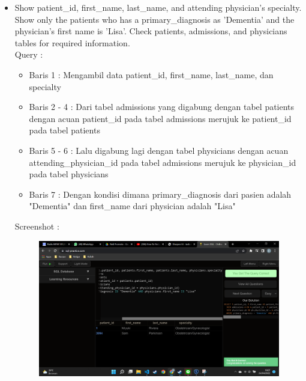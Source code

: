 \documentclass[]{article}
\begin{document}
\begin{itemize}
        \item Show patient\_id, first\_name, last\_name, and attending physician's specialty. Show only the patients who has a primary\_diagnosis as 'Dementia' and the physician's first name is 'Lisa'. Check patients, admissions, and physicians tables for required information.
        \\Query :
        
        \begin{itemize}
            \item Baris 1 : Mengambil data patient\_id, first\_name, last\_name, dan specialty
            \item Baris 2 - 4 : Dari tabel admissions yang digabung dengan tabel patients dengan acuan patient\_id pada tabel admissions merujuk ke patient\_id pada tabel patients
            \item Baris 5 - 6 : Lalu digabung lagi dengan tabel physicians dengan acuan attending\_physician\_id pada tabel admissions merujuk ke physician\_id pada tabel physicians
            \item Baris 7 : Dengan kondisi dimana primary\_diagnosis dari pasien adalah "Dementia" dan first\_name dari physician adalah "Lisa"
        \end{itemize}
        \pagebreak
        Screenshot :
        \begin{figure}[h]
            \includegraphics[scale=0.3]{./Screenshot/Hard-3.png}
            \centering
        \end{figure}


\end{itemize}
\end{document}
